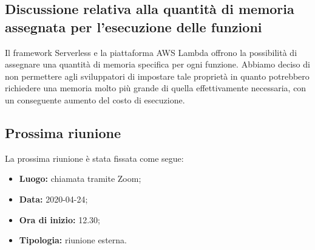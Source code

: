 	\subsection{Discussione relativa alla quantità di memoria assegnata per l'esecuzione delle funzioni}
	Il framework Serverless e la piattaforma AWS Lambda offrono la possibilità di assegnare una quantità di memoria specifica per ogni funzione.
	Abbiamo deciso di non permettere agli sviluppatori di impostare tale proprietà in quanto potrebbero richiedere una memoria molto più grande di quella effettivamente necessaria, con un conseguente aumento del costo di esecuzione.

	\subsection{Prossima riunione}
		La prossima riunione è stata fissata come segue:
		\begin{itemize}
			\item \textbf{Luogo: } chiamata tramite Zoom;
			\item \textbf{Data: } 2020-04-24;
			\item \textbf{Ora di inizio: } 12.30;
			\item \textbf{Tipologia: } riunione esterna.
		\end{itemize}
